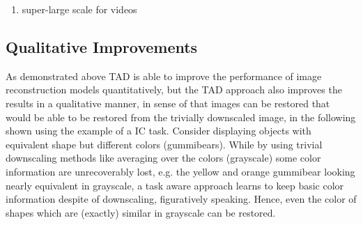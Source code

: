 \begin{enumerate}
\item super-large scale for videos
\end{enumerate}

\subsection{Qualitative Improvements}
\label{sec:Experiments_QI}
As demonstrated above \ac{TAD} is able to improve the performance of
image reconstruction models quantitatively, but the \ac{TAD} approach also
improves the results in a qualitative manner, in sense of that images can be
restored that would be able to be restored from the trivially downscaled image,
in the following shown using the example of a \ac{IC} task.
\newline
Consider  displaying objects with equivalent shape
but different colors (gummibears). While by using trivial downscaling methods
like averaging over the colors (grayscale) some color information are
unrecoverably lost, e.g. the yellow and orange gummibear looking nearly
equivalent in grayscale, a task aware approach learns to keep basic color
information despite of downscaling, figuratively speaking. Hence, even the color
of shapes which are (exactly) similar in grayscale can be restored.

